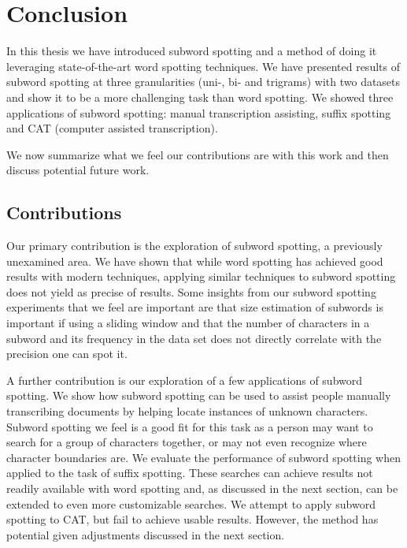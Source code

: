 \documentclass[ms,electronic,twosidetoc,letterpaper,chaptercenter,parttop,lof,lot]{byumsphd}
\begin{document}




\chapter{Conclusion}

In this thesis we have introduced subword spotting and a method of doing it leveraging state-of-the-art word spotting techniques. We have presented results of subword spotting at three granularities (uni-, bi- and trigrams) with two datasets and show it to be a more challenging task than word spotting. We showed three applications of subword spotting: manual transcription assisting, suffix spotting and CAT (computer assisted transcription).

We now summarize what we feel our contributions are with this work and then discuss potential future work.

\section{Contributions}


Our primary contribution is the exploration of subword spotting, a previously unexamined area. We have shown that while word spotting has achieved good results with modern techniques, applying similar techniques to subword spotting does not yield as precise of results.
Some insights from our subword spotting experiments that we feel are important are that 
size estimation of subwords is important if using a sliding window
and that
the number of characters in a subword  and its frequency in the data set does not directly correlate with the precision one can spot it.

A further contribution is our exploration of a few applications of subword spotting.
We show how subword spotting can be used to assist people manually transcribing documents by helping locate instances of unknown characters. Subword spotting we feel is a good fit for this task as a person may want to search for a group of characters together, or may not even recognize where character boundaries are.
We evaluate the performance of subword spotting when applied to the task of suffix spotting. 
These searches can achieve results not readily available with word spotting and, as discussed in the next section, can be extended to even more customizable searches.
We attempt to apply subword spotting to CAT, but fail to achieve usable results. However, the method has potential given adjustments discussed in the next section.
\end{document}
